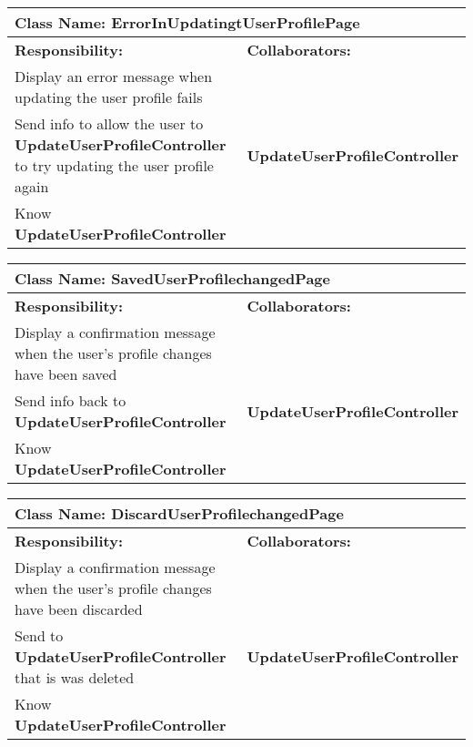 \documentclass[]{article}
\begin{document}
    \begin{table}[H]
        \centering
        \begin{tabular}{|p{5cm}|p{5cm}|}
        \hline 
         \multicolumn{2}{|l|}{\textbf{Class Name:} ErrorInUpdatingtUserProfilePage} \\
        \hline
        \textbf{Responsibility:} & \textbf{Collaborators:} \\
        \hline
        Display an error message when updating the user profile fails & \phantom{} \\
        \hline
        Send info to allow the user to \textbf{UpdateUserProfileController} to try updating the user profile again & \textbf{UpdateUserProfileController} \\
        \hline
         Know \textbf{UpdateUserProfileController} & \phantom{} \\
        \hline
      
        \end{tabular}
    \end{table}
    

\begin{table}[H]
        \centering
        \begin{tabular}{|p{5cm}|p{5cm}|}
        \hline 
         \multicolumn{2}{|l|}{\textbf{Class Name:} SavedUserProfilechangedPage} \\
        \hline
        \textbf{Responsibility:} & \textbf{Collaborators:} \\
        \hline
        Display a confirmation message when the user's profile changes have been saved & \phantom{} \\
        \hline
        Send info back to \textbf{UpdateUserProfileController}  & \textbf{UpdateUserProfileController} \\
        \hline
         Know \textbf{UpdateUserProfileController} & \phantom{} \\
        \hline
        
        \end{tabular}
    \end{table}



\begin{table}[H]
        \centering
        \begin{tabular}{|p{5cm}|p{5cm}|}
        \hline 
         \multicolumn{2}{|l|}{\textbf{Class Name:} DiscardUserProfilechangedPage} \\
        \hline
        \textbf{Responsibility:} & \textbf{Collaborators:} \\
        \hline
       Display a confirmation message when the user's profile changes have been discarded & \phantom{} \\
        \hline
        Send to \textbf{UpdateUserProfileController} that is was deleted & \textbf{UpdateUserProfileController} \\
        \hline
        Know \textbf{UpdateUserProfileController} & \phantom{} \\
        \hline
        
        \end{tabular}
    \end{table}
\end{document}
